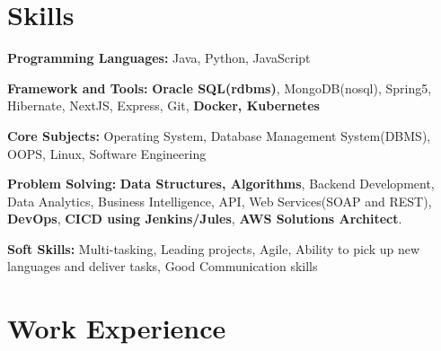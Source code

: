 \documentclass[letterpaper]{resume_config}
\begin{document}









\section{Skills}
\begin{SkillsList}
    \item \textbf{Programming Languages:} Java, Python, JavaScript \\
    \item \textbf{Framework and Tools:} \textbf{Oracle SQL(rdbms)}, MongoDB(nosql), Spring5, Hibernate, NextJS, Express, Git, \textbf{Docker, Kubernetes}  \\
    \item \textbf{Core Subjects:} Operating System, Database Management System(DBMS), OOPS, Linux, Software Engineering
    \item \textbf{Problem Solving:} \textbf{Data Structures, Algorithms}, Backend Development, Data Analytics, Business Intelligence, API, Web Services(SOAP and REST), \textbf{DevOps}, \textbf{CICD using Jenkins/Jules}, \textbf{AWS Solutions Architect}.
    \item \textbf{Soft Skills:} Multi-tasking, Leading projects, Agile, Ability to pick up new languages and deliver tasks, Good Communication skills
\end{SkillsList}

\section{Work Experience}
\end{document}
